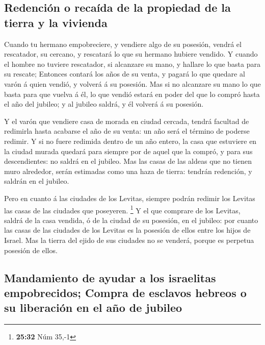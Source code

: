 \hypertarget{redenciuxf3n-o-recauxedda-de-la-propiedad-de-la-tierra-y-la-vivienda}{%
\subsection{Redención o recaída de la propiedad de la tierra y la
vivienda}\label{redenciuxf3n-o-recauxedda-de-la-propiedad-de-la-tierra-y-la-vivienda}}

 Cuando tu hermano empobreciere, y vendiere algo de su
posesión, vendrá el rescatador, su cercano, y rescatará lo que su
hermano hubiere vendido.  Y cuando el hombre no tuviere
rescatador, si alcanzare su mano, y hallare lo que basta para su
rescate;  Entonces contará los años de su venta, y pagará
lo que quedare al varón á quien vendió, y volverá á su posesión.
 Mas si no alcanzare su mano lo que basta para que vuelva
á él, lo que vendió estará en poder del que lo compró hasta el año del
jubileo; y al jubileo saldrá, y él volverá á su posesión.

 Y el varón que vendiere casa de morada en ciudad
cercada, tendrá facultad de redimirla hasta acabarse el año de su venta:
un año será el término de poderse redimir.  Y si no fuere
redimida dentro de un año entero, la casa que estuviere en la ciudad
murada quedará para siempre por de aquel que la compró, y para sus
descendientes: no saldrá en el jubileo.  Mas las casas de
las aldeas que no tienen muro alrededor, serán estimadas como una haza
de tierra: tendrán redención, y saldrán en el jubileo.

 Pero en cuanto á las ciudades de los Levitas, siempre
podrán redimir los Levitas las casas de las ciudades que poseyeren.
\footnote{\textbf{25:32} Núm 35,-1}  Y el que comprare de
los Levitas, saldrá de la casa vendida, ó de la ciudad de su posesión,
en el jubileo: por cuanto las casas de las ciudades de los Levitas es la
posesión de ellos entre los hijos de Israel.  Mas la
tierra del ejido de sus ciudades no se venderá, porque es perpetua
posesión de ellos.

\hypertarget{mandamiento-de-ayudar-a-los-israelitas-empobrecidos-compra-de-esclavos-hebreos-o-su-liberaciuxf3n-en-el-auxf1o-de-jubileo}{%
\subsection{Mandamiento de ayudar a los israelitas empobrecidos; Compra
de esclavos hebreos o su liberación en el año de
jubileo}\label{mandamiento-de-ayudar-a-los-israelitas-empobrecidos-compra-de-esclavos-hebreos-o-su-liberaciuxf3n-en-el-auxf1o-de-jubileo}}

